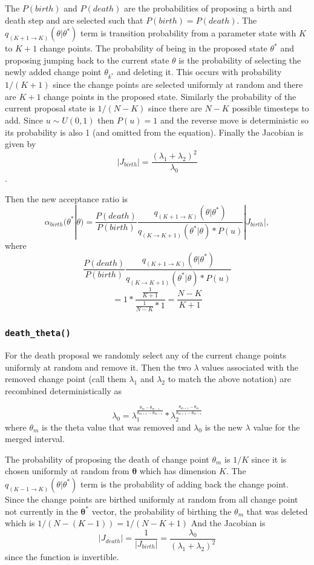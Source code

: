 \documentclass[11pt,a4paper]{article}
\begin{document}
The \(P(birth)\) and \(P(death)\) are the probabilities of proposing a
birth and death step and are selected such that \(P(birth) = P(death)\).
The \(q_{(K+1\rightarrow K)}(\theta|\theta^*)\) term is transition
probability from a parameter state with \(K\) to \(K+1\) change points.
The probability of being in the proposed state \(\theta^*\) and
proposing jumping back to the current state \(\theta\) is the
probability of selecting the newly added change point \(\theta_{k^*}\)
and deleting it. This occurs with probability \(1/(K+1)\) since the
change points are selected uniformly at random and there are \(K+1\)
change points in the proposed state. Similarly the probability of the
current proposal state is \(1/(N-K)\) since there are \(N-K\) possible
timesteps to add. Since \(u \sim U(0,1)\) then \(P(u) = 1\) and the
reverse move is deterministic so its probability is also 1 (and omitted
from the equation). Finally the Jacobian is given by
\[ |J_{birth}| = \frac{(\lambda_1 + \lambda_2)^2}{\lambda_0}\] .

Then the new acceptance ratio is
\[\alpha_{birth}(\theta^*|\theta) = \frac{P(death)}{P(birth)}\frac{q_{(K+1\rightarrow K)}(\theta|\theta^*)}{q_{(K\rightarrow K + 1)}(\theta^*|\theta)*P(u)}|J_{birth}|,\]
where
\[  \frac{P(death)}{P(birth)}\frac{q_{(K+1\rightarrow K)}(\theta|\theta^*)}{q_{(K\rightarrow K + 1)}(\theta^*|\theta)*P(u)} \]
\[= 1*\frac{\frac{1}{K+1}}{\frac{1}{N-K}*1} = \frac{N-K}{K+1} \]

\hypertarget{death_theta}{%
\subsubsection{\texorpdfstring{\texttt{death\_theta()}}{death\_theta()}}\label{death_theta}}

For the death proposal we randomly select any of the current change
points uniformly at random and remove it. Then the two \(\lambda\)
values associated with the removed change point (call them \(\lambda_1\)
and \(\lambda_2\) to match the above notation) are recombined
deterministically as

\[ \lambda_0 =\lambda_1^{\frac{\theta_m-\theta_{m-1}}{\theta_{m+1}-\theta_{m-1}}}*\lambda_2^{\frac{\theta_{m+1}-\theta_{m}}{\theta_{m+1}-\theta_{m-1}}} \]
where \(\theta_m\) is the theta value that was removed and \(\lambda_0\)
is the new \(\lambda\) value for the merged interval.

The probability of proposing the death of change point \(\theta_m\) is
\(1/K\) since it is chosen uniformly at random from
\(\boldsymbol{\theta}\) which has dimension \(K\). The
\(q_{(K-1\rightarrow K)}(\theta|\theta^*)\) term is the probability of
adding back the change point. Since the change points are birthed
uniformly at random from all change point not currently in the
\(\boldsymbol{\theta^*}\) vector, the probability of birthing the
\(\theta_m\) that was deleted which is \(1/(N-(K-1)) = 1/(N-K+1)\) And
the Jacobian is
\[|J_{death}| = \frac{1}{|J_{birth}|} = \frac{\lambda_0}{(\lambda_1 + \lambda_2)^2}\]
since the function is invertible.
\end{document}
